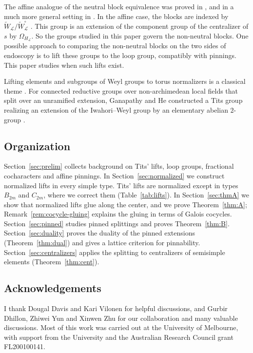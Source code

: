 \documentclass[psamsfonts]{amsart}
\theoremstyle{definition}
\theoremstyle{remark}
\numberwithin{equation}{section}
\newcommand{\extw}{\widetilde{W}}
\newcommand\cL{\mathcal{L}}
\numberwithin{equation}{section}
\newcommand{\Om}{\Omega}
\theoremstyle{plain}
\begin{document}
The affine analogue of the neutral block equivalence was proved in \cite[Theorem~1.1]{Li24}, and in a much more general setting in \cite{DLYZ}. In the affine case, the blocks are indexed by $\extw_{\cL}/\extw_{\cL}^{\circ}$ \cite[\S4.3]{Li24}. This group is an extension of the component group of the centralizer of $s$ by $\Om_{H_{\cL}}$. So the groups studied in this paper govern the non-neutral blocks. One possible approach to comparing the non-neutral blocks on the two sides of endoscopy is to lift these groups to the loop group, compatibly with pinnings. This paper studies when such lifts exist.

Lifting elements and subgroups of Weyl groups to torus normalizers is a classical theme \cite{Ti66,AH17,Lus18}. For connected reductive groups over non-archimedean local fields that split over an unramified extension, Ganapathy and He constructed a Tits group realizing an extension of the Iwahori--Weyl group by an elementary abelian $2$-group \cite{GH23}.

\subsection{Organization}
Section~\ref{sec:prelim} collects background on Tits' lifts, loop groups, fractional cocharacters and affine pinnings. In Section~\ref{sec:normalized} we construct normalized lifts in every simple type. Tits' lifts are normalized except in types $B_{2m}$ and $C_{2m}$, where we correct them (Table~\ref{tab:lifts}). In Section~\ref{sec:thmA} we show that normalized lifts glue along the center, and we prove Theorem~\ref{thm:A}; Remark~\ref{rem:cocycle-gluing} explains the gluing in terms of Galois cocycles. Section~\ref{sec:pinned} studies pinned splittings and proves Theorem~\ref{thm:B}. Section~\ref{sec:duality} proves the duality of the pinned extensions (Theorem~\ref{thm:dual}) and gives a lattice criterion for pinnability. Section~\ref{sec:centralizers} applies the splitting to centralizers of semisimple elements (Theorem~\ref{thm:cent}).

\subsection*{Acknowledgements}
I thank Dougal Davis and Kari Vilonen for helpful discussions, and Gurbir Dhillon, Zhiwei Yun and Xinwen Zhu for our collaboration and many valuable discussions. Most of this work was carried out at the University of Melbourne, with support from the University and the Australian Research Council grant FL200100141.
\end{document}
